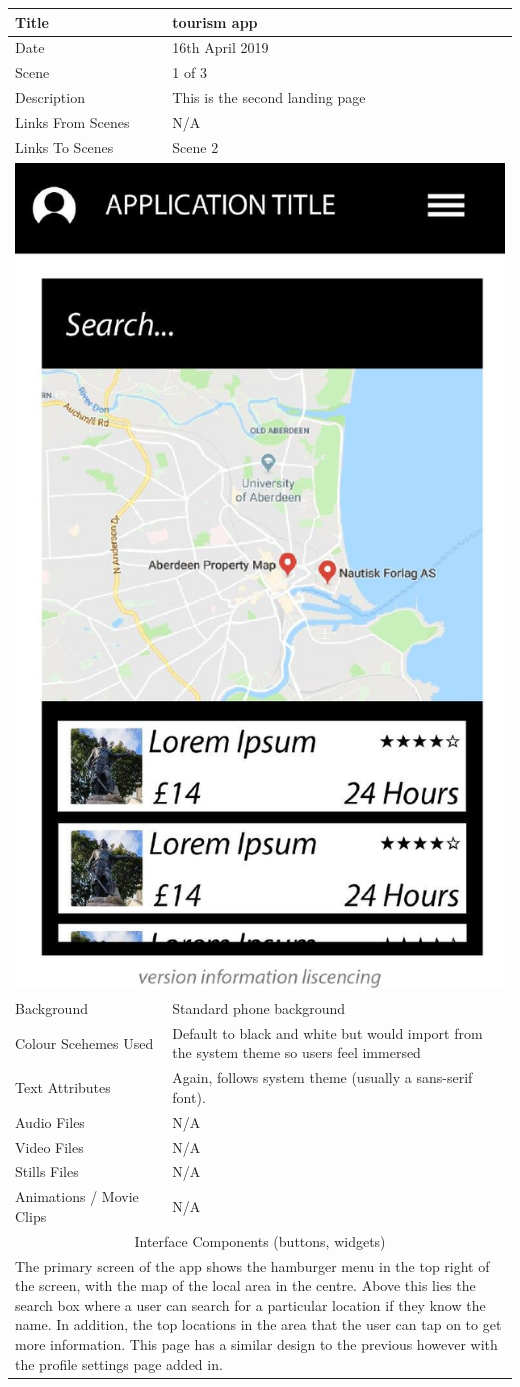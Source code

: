 \hspace{-1cm}
	\centering
	\begin{tabular}{p{4cm}p{10cm}}
		\hline
		Title & tourism app \\
		\hline
		Date & 16th April 2019 \\
		\hline
		Scene & 1 of 3 \\
		\hline
		Description & This is the second landing page \\
		\hline
		Links From Scenes & N/A \\
		\hline
		Links To Scenes & Scene 2 \\
		\hline
		\multicolumn{2}{c}{\includegraphics[width=0.5\linewidth]{images/screen0-1.jpg}} \\
		\hline
		Background & Standard phone background \\
		\hline
		Colour Scehemes Used & Default to black and white but would import from the system theme so users feel immersed \\
		\hline
		Text Attributes & Again, follows system theme (usually a sans-serif font). \\
		\hline
		Audio Files & N/A \\
		\hline
		Video Files & N/A \\
		\hline
		Stills Files & N/A \\
		\hline
		Animations / Movie Clips & N/A \\
		\hline
		\multicolumn{2}{c}{Interface Components (buttons, widgets)} \\
		\hline
		\multicolumn{2}{p{14cm}}{The primary screen of the app shows the hamburger menu in the top right of the screen, with the map of the local area in the centre. Above this lies the search box where a user can search for a particular location if they know the name. In addition, the top locations in the area that the user can tap on to get more information. This page has a similar design to the previous however with the profile settings page added in. } \\
		\hline
	\end{tabular}
